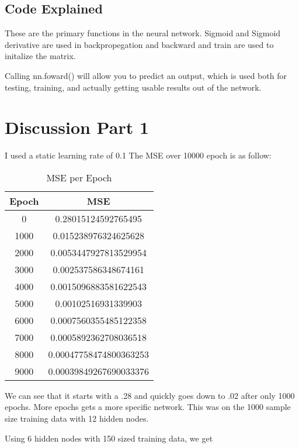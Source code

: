 \documentclass[12pt]{article}
\begin{document}
\subsection{Code Explained}
These are the primary functions in the neural network. Sigmoid and Sigmoid derivative are used in backpropegation and backward and train are used to initalize the matrix. 

Calling nn.foward() will allow you to predict an output, which is used both for testing, training, and actually getting usable results out of the network. 

\section{Discussion Part 1}
I used a static learning rate of 0.1 The MSE over 10000 epoch is as follow:
\begin{table}[h!]
  \centering
  \caption{MSE per Epoch}
  \label{tab:mse}
  \begin{tabular}{|c|c|}
    \hline
    \textbf{Epoch} & \textbf{MSE} \\
    \hline
    0 & 0.28015124592765495 \\
    \hline
    1000 & 0.015238976324625628 \\
    \hline
    2000 & 0.0053447927813529954 \\
    \hline
    3000 & 0.002537586348674161 \\
    \hline
    4000 & 0.0015096883581622543 \\
    \hline
    5000 & 0.00102516931339903 \\
    \hline
    6000 & 0.0007560355485122358 \\
    \hline
    7000 & 0.0005892362708036518 \\
    \hline
    8000 & 0.00047758474800363253 \\
    \hline
    9000 & 0.00039849267690033376 \\
    \hline
  \end{tabular}
\end{table}


We can see that it starts with a .28 and quickly goes down to .02 after only 1000 epochs. More epochs gets a more specific network. This was on the 1000 sample size training data with 12 hidden nodes. 

Using 6 hidden nodes with 150 sized training data, we get 
\end{document}
